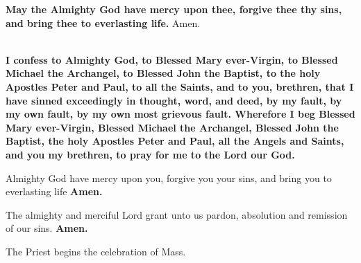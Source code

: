 \textbf{May the Almighty God have mercy upon thee, forgive thee thy sins, and
bring thee to everlasting life.}
Amen.

\\
\textbf{I confess to Almighty God, to Blessed Mary ever-Virgin, to Blessed Michael
the Archangel, to Blessed John the Baptist, to the holy Apostles Peter and
Paul, to all the Saints, and to you, brethren, that I have sinned exceedingly in
thought, word, and deed, by my fault, by my own fault, by my own most
grievous fault. Wherefore I beg Blessed Mary ever-Virgin, Blessed Michael
the Archangel, Blessed John the Baptist, the holy Apostles Peter and Paul, all
the Angels and Saints, and you my brethren, to pray for me to the Lord our
God.}

Almighty God have mercy upon you, forgive you your sins, and bring you to
everlasting life \textbf{Amen.}

\cross The almighty and merciful Lord grant unto us pardon, absolution and
remission of our sins. \textbf{Amen.}


\begin{rubric}
The Priest begins the celebration of Mass.
\end{rubric}

\clearpage
